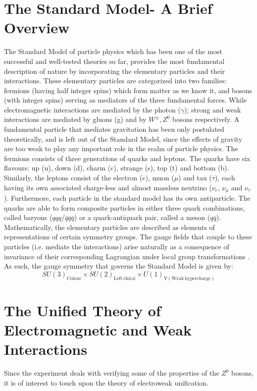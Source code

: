 \section{The Standard Model- A Brief Overview}
The Standard Model of particle physics which has been one of the most successful and well-tested theories so far, provides the most fundamental description of nature by incorporating the elementary particles and their interactions. These elementary particles are categorized into two families: fermions (having half integer spins) which form matter as we know it, and bosons (with integer spins) serving as mediators of the three fundamental forces. While electromagnetic interactions are mediated by the photon ($\gamma$); strong and weak interactions are mediated by gluons (g) and by $W^{\pm}, Z^{0}$ bosons respectively. A fundamental particle that mediates gravitation has been only postulated theoretically, and is left out of the Standard Model, since the effects of gravity are too weak to play any important role in the realm of particle physics. The fermions consists of three generations of quarks and leptons. The quarks have six flavours: up (u), down (d), charm (c), strange (s), top (t) and bottom (b). Similarly, the leptons consist of the electron ($e$), muon ($\mu$) and tau ($\tau$), each having its own associated charge-less and almost massless neutrino ($\nu_{e}$, $\nu_{\mu}$ and $\nu_{\tau}$). Furthermore, each particle in the standard model has its own antiparticle. The quarks are able to form composite particles in either three quark combinations, called baryons ($qqq$/$\bar{q}\bar{q}\bar{q}$) or a quark-antiquark pair, called a meson ($q\bar{q}$). Mathematically, the elementary particles are described as elements of representations of certain symmetry groups. The gauge fields that couple to these particles (i.e. mediate the interactions) arise naturally as a consequence of invariance of their corresponding Lagrangian under local group transformations \cite{thomson_2013}. As such, the gauge symmetry that governs the Standard Model is given by: $$SU(3)_{\mathrm{Colour}}\times SU(2)_{\mathrm{Left\ chiral}}\times U(1)_{\mathrm{Y}(\mathrm{Weak \ hypercharge})}$$

\section{The Unified Theory of Electromagnetic and Weak Interactions}
Since the experiment deals with verifying some of the properties of the $Z^{0}$ bosons, it is of interest to touch upon the theory of electroweak unification.

